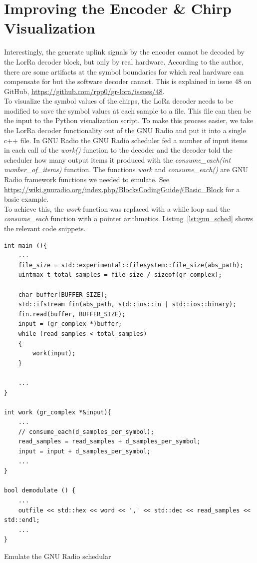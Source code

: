 \section{Improving the Encoder \& Chirp Visualization}
Interestingly, the generate uplink signals by the encoder cannot be decoded 
by the LorRa decoder block, but only by real hardware. According to the author, there are some artifacts
at the symbol boundaries for which real hardware can compensate for but the software decoder cannot.
This is explained in issue 48 on GitHub, \url{https://github.com/rpp0/gr-lora/issues/48}.
\\
To visualize the symbol values of the chirps, the LoRa decoder needs to be modified to save the symbol values at each sample to a file. This file can then be the input to 
the Python visualization script.
To make this process easier, we take the LorRa decoder functionality out of the GNU Radio and put it into a single c++ file.
In GNU Radio the GNU Radio scheduler fed a number of input items in each call of the \emph{work()} function to the decoder and the decoder told the scheduler how many output items it produced with the \emph{consume\_each(int number\_of\_items)} function.
The functions \emph{work} and \emph{consume\_each()} are GNU Radio framework functions we needed to emulate. See \url{https://wiki.gnuradio.org/index.php/BlocksCodingGuide#Basic_Block} for a basic example. \\
To achieve this, the \emph{work} function was replaced with a while loop and the \emph{consume\_each} function with a pointer arithmetics.
Listing~\ref{lst:gnu_sched} shows the relevant code snippets.

\begin{listing}[h]
    \begin{verbatim}
int main (){
    ...
    file_size = std::experimental::filesystem::file_size(abs_path);
    uintmax_t total_samples = file_size / sizeof(gr_complex);

    char buffer[BUFFER_SIZE];
    std::ifstream fin(abs_path, std::ios::in | std::ios::binary);
    fin.read(buffer, BUFFER_SIZE);
    input = (gr_complex *)buffer;
    while (read_samples < total_samples)
    {
        work(input);
    }

    ...
}

int work (gr_complex *&input){
    ...
    // consume_each(d_samples_per_symbol);
    read_samples = read_samples + d_samples_per_symbol;
    input = input + d_samples_per_symbol;
    ...
}

bool demodulate () {
    ... 
    outfile << std::hex << word << ',' << std::dec << read_samples << std::endl;
    ...
}
        \end{verbatim}
        \caption{Emulate the GNU Radio schedular}
        \label{lst:gnu_sched}
\end{listing}

